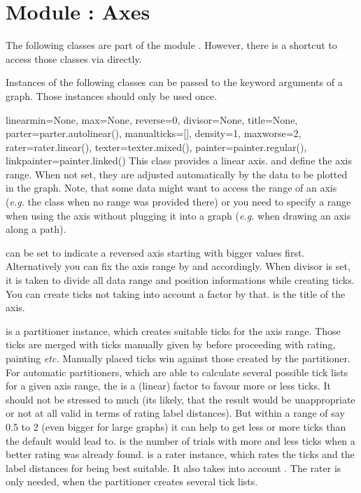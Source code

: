\section{Module : Axes} %


The following classes are part of the module .
However, there is a shortcut to access those classes via
 directly.

Instances of the following classes can be passed to the 
keyword arguments of a graph. Those instances should only be used once.

\begin{classdesc}{linear}{min=None, max=None, reverse=0, divisor=None, title=None,
                          parter=parter.autolinear(), manualticks=[],
                          density=1, maxworse=2, rater=rater.linear(),
                          texter=texter.mixed(), painter=painter.regular(),
                          linkpainter=painter.linked()}
  This class provides a linear axis.  and  define the
  axis range. When not set, they are adjusted automatically by the
  data to be plotted in the graph. Note, that some data might want to
  access the range of an axis (\emph{e.g.} the  class
  when no range was provided there) or you need to specify a range
  when using the axis without plugging it into a graph (\emph{e.g.}
  when drawing an axis along a path).

   can be set to indicate a reversed axis starting with
  bigger values first. Alternatively you can fix the axis range by
   and  accordingly. When divisor is set, it is
  taken to divide all data range and position informations while
  creating ticks. You can create ticks not taking into account a
  factor by that.  is the title of the axis.

   is a partitioner instance, which creates suitable ticks
  for the axis range. Those ticks are merged with ticks manually given 
  by  before proceeding with rating, painting
  \emph{etc.} Manually placed ticks win against those created by the
  partitioner. For automatic partitioners, which are able to calculate
  several possible tick lists for a given axis range, the
   is a (linear) factor to favour more or less ticks. It
  should not be stressed to much (its likely, that the result would be
  unappropriate or not at all valid in terms of rating label
  distances). But within a range of say 0.5 to 2 (even bigger for
  large graphs) it can help to get less or more ticks than the default
  would lead to.  is the number of trials with more
  and less ticks when a better rating was already found. 
  is a rater instance, which rates the ticks and the label distances
  for being best suitable. It also takes into account .
  The rater is only needed, when the partitioner creates several tick
  lists.


\end{classdesc}
